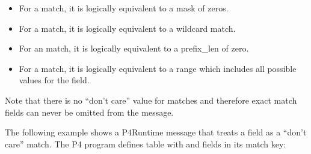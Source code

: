 \documentclass[11pt]{article}
\begin{document}
{\begin{itemize}
\item{}
For a  match, it is logically equivalent to a mask of zeros.%

\item{}
For a  match, it is logically equivalent to a wildcard match.%

\item{}
For an  match, it is logically equivalent to a prefix\_len of zero.%

\item{}
For a  match, it is logically equivalent to a range which includes all
possible values for the field.%
\end{itemize}%

\noindent{}Note that there is no \textquotedblleft{}don't care\textquotedblright{} value for  matches and therefore exact
match fields can never be omitted from the  message.%

The following example shows a P4Runtime message that treats a  field
as a \textquotedblleft{}don't care\textquotedblright{} match. The P4 program defines table  with 
and  fields in its match key:%

}
\end{document}
